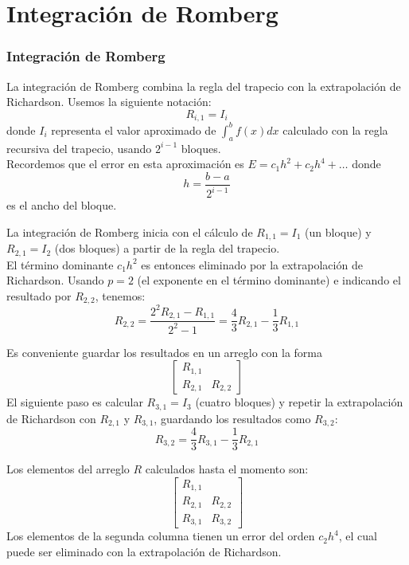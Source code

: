 \section{Integraci\'{o}n de Romberg}
\begin{frame}
\frametitle{Integraci\'{o}n de Romberg}
La integraci\'{o}n de Romberg combina la regla del trapecio con la extrapolaci\'{o}n de Richardson. Usemos la siguiente notaci\'{o}n:
\[ R_{i,1} = I_{i} \]
donde $I_{i}$ representa el valor aproximado de $\int_{a}^{b}f(x)dx$ calculado con la regla recursiva del trapecio, usando $2^{i-1}$ bloques.
\\
\bigskip
Recordemos que el error en esta aproximaci\'{o}n es $E= c_{1}h^{2}+ c_{2}h^{4}+ \ldots$ donde
\[ h = \dfrac{b-a}{2^{i-1}} \]
es el ancho del bloque.
\end{frame}
\begin{frame}
La integraci\'{o}n de Romberg inicia con el c\'{a}lculo de $R_{1,1} = I_{1}$ (un bloque) y $R_{2,1} = I_{2}$ (dos bloques) a partir de la regla del trapecio.
\\
\bigskip
El t\'{e}rmino dominante $c_{1}h^{2}$ es entonces eliminado por la extrapolaci\'{o}n de Richardson. Usando $p=2$ (el exponente en el t\'{e}rmino dominante) e indicando el resultado por $R_{2,2}$, tenemos:
\[ R_{2,2} = \dfrac{2^{2}R_{2,1} - R_{1,1}}{2^{2}-1} = \dfrac{4}{3} R_{2,1} - \dfrac{1}{3} R_{1,1} \]
\end{frame}
\begin{frame}
Es conveniente guardar los resultados en un arreglo con la forma
\[ \begin{bmatrix}
R_{1,1} & \\
R_{2,1} & R_{2,2}
\end{bmatrix} \]
El siguiente paso es calcular $R_{3,1}= I_{3}$ (cuatro bloques) y repetir la extrapolaci\'{o}n de Richardson con $R_{2,1}$ y $R_{3,1}$, guardando los resultados como $R_{3,2}$:
\[ R_{3,2} = \dfrac{4}{3} R_{3,1} - \dfrac{1}{3} R_{2,1} \]
\end{frame}
\begin{frame}
Los elementos del arreglo $R$ calculados hasta el momento son:
\[ \begin{bmatrix}
R_{1,1} & \\
R_{2,1} & R_{2,2} \\
R_{3,1} & R_{3,2}
\end{bmatrix} \]
Los elementos de la segunda columna tienen un error del orden $c_{2}h^{4}$, el cual puede ser eliminado con la extrapolaci\'{o}n de Richardson.
\end{frame}
